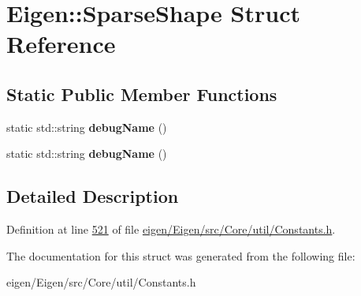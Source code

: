\hypertarget{struct_eigen_1_1_sparse_shape}{}\section{Eigen\+:\+:Sparse\+Shape Struct Reference}
\label{struct_eigen_1_1_sparse_shape}
\subsection*{Static Public Member Functions}
\begin{DoxyCompactItemize}
\item 
\mbox{\label{struct_eigen_1_1_sparse_shape_a0a0b77bfa8e396b828d3268abaaadfd9}} 
static std\+::string {\bfseries debug\+Name} ()
\item 
\mbox{\label{struct_eigen_1_1_sparse_shape_a0a0b77bfa8e396b828d3268abaaadfd9}} 
static std\+::string {\bfseries debug\+Name} ()
\end{DoxyCompactItemize}


\subsection{Detailed Description}


Definition at line \hyperlink{eigen_2_eigen_2src_2_core_2util_2_constants_8h_source_l00521}{521} of file \hyperlink{eigen_2_eigen_2src_2_core_2util_2_constants_8h_source}{eigen/\+Eigen/src/\+Core/util/\+Constants.\+h}.



The documentation for this struct was generated from the following file\+:\begin{DoxyCompactItemize}
\item 
eigen/\+Eigen/src/\+Core/util/\+Constants.\+h\end{DoxyCompactItemize}
